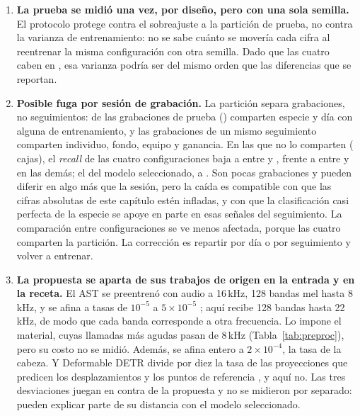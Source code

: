 \begin{enumerate}
          el \rShareTwoWindow{} de las cajas de prueba: todo agregado que las
          incluya, como el \textit{recall} global, sale más alto que el de las
          clases de evento.
    \item \textbf{La prueba se midió una vez, por diseño, pero con una sola
              semilla.} El protocolo protege contra el sobreajuste a la partición de
          prueba, no contra la varianza de entrenamiento: no se sabe cuánto se
          movería cada cifra al reentrenar la misma configuración con otra semilla.
          Dado que las cuatro caben en \rRecallSpread{}, esa varianza podría ser del
          mismo orden que las diferencias que se reportan.
    \item \textbf{Posible fuga por sesión de grabación.} La partición separa
          grabaciones, no seguimientos: \rLeakShared{} de las \rLeakTest{}
          grabaciones de prueba (\rLeakShare{}) comparten especie y día con alguna
          de entrenamiento, y las grabaciones de un mismo seguimiento comparten
          individuo, fondo, equipo y ganancia. En las \rLeakNew{} que no lo comparten
          (\rLeakNewBoxes{} cajas), el \textit{recall} de las cuatro configuraciones
          baja a entre \rLeakNewMin{} y \rLeakNewMax{}, frente a entre
          \rLeakSharedMin{} y \rLeakSharedMax{} en las demás; el del modelo
          seleccionado, a \rLeakNewYol{} \rLeakNewYolCi{}. Son pocas grabaciones y
          pueden diferir en algo más que la sesión, pero la caída es compatible con
          que las cifras absolutas de este capítulo estén infladas, y con que la
          clasificación casi perfecta de la especie se apoye en parte en esas
          señales del seguimiento. La comparación entre configuraciones se ve menos
          afectada, porque las cuatro comparten la partición. La corrección es
          repartir por día o por seguimiento y volver a entrenar.
    \item \textbf{La propuesta se aparta de sus trabajos de origen en la entrada y
              en la receta.} El AST se preentrenó con audio a 16\,kHz, 128 bandas
          mel hasta 8\,kHz, y se afina a tasas de $10^{-5}$ a $5 \times 10^{-5}$
          \citep{gong_ast_2021}; aquí recibe 128 bandas hasta 22\,kHz, de modo que
          cada banda corresponde a otra frecuencia. Lo impone el material, cuyas
          llamadas más agudas pasan de 8\,kHz (Tabla~\ref{tab:preproc}), pero su
          costo no se midió. Además, se afina entero a $2 \times 10^{-4}$, la tasa
          de la cabeza. Y Deformable DETR
          divide por diez la tasa de las proyecciones que predicen los
          desplazamientos y los puntos de referencia \citep{zhu_deformable_2021}, y
          aquí no. Las tres desviaciones juegan en contra de la propuesta y no se
          midieron por separado: pueden explicar parte de su distancia con el
          modelo seleccionado.
\end{enumerate}
